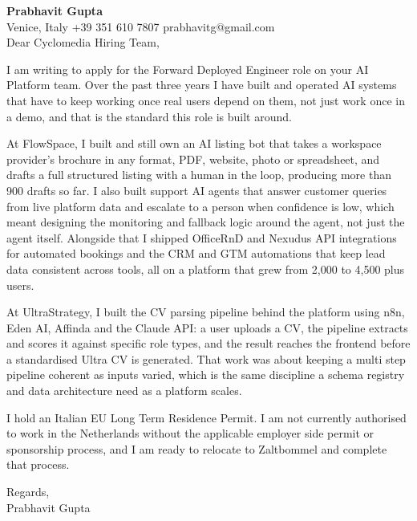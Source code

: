 \documentclass[a4paper,10.5pt]{article}
\begin{document}
\textbf{Prabhavit Gupta}\\
Venice, Italy \textbar{} +39 351 610 7807 \textbar{} prabhavitg@gmail.com\\[10pt]
Dear Cyclomedia Hiring Team,

I am writing to apply for the Forward Deployed Engineer role on your AI Platform team. Over the past three years I have built and operated AI systems that have to keep working once real users depend on them, not just work once in a demo, and that is the standard this role is built around.

At FlowSpace, I built and still own an AI listing bot that takes a workspace provider's brochure in any format, PDF, website, photo or spreadsheet, and drafts a full structured listing with a human in the loop, producing more than 900 drafts so far. I also built support AI agents that answer customer queries from live platform data and escalate to a person when confidence is low, which meant designing the monitoring and fallback logic around the agent, not just the agent itself. Alongside that I shipped OfficeRnD and Nexudus API integrations for automated bookings and the CRM and GTM automations that keep lead data consistent across tools, all on a platform that grew from 2,000 to 4,500 plus users.

At UltraStrategy, I built the CV parsing pipeline behind the platform using n8n, Eden AI, Affinda and the Claude API: a user uploads a CV, the pipeline extracts and scores it against specific role types, and the result reaches the frontend before a standardised Ultra CV is generated. That work was about keeping a multi step pipeline coherent as inputs varied, which is the same discipline a schema registry and data architecture need as a platform scales.

I hold an Italian EU Long Term Residence Permit. I am not currently authorised to work in the Netherlands without the applicable employer side permit or sponsorship process, and I am ready to relocate to Zaltbommel and complete that process.

Regards,\\
Prabhavit Gupta
\end{document}
